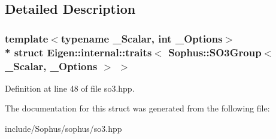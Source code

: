 \subsection{Detailed Description}
\subsubsection*{template$<$typename \+\_\+\+Scalar, int \+\_\+\+Options$>$\\*
struct Eigen\+::internal\+::traits$<$ Sophus\+::\+S\+O3\+Group$<$ \+\_\+\+Scalar, \+\_\+\+Options $>$ $>$}



Definition at line 48 of file so3.\+hpp.



The documentation for this struct was generated from the following file\+:\begin{DoxyCompactItemize}
\item 
include/\+Sophus/sophus/so3.\+hpp\end{DoxyCompactItemize}
